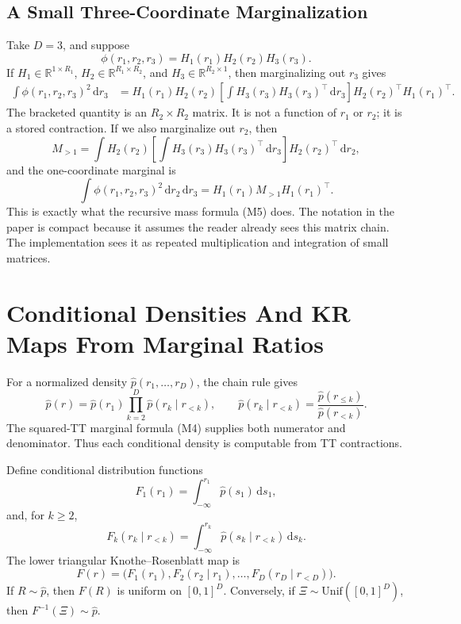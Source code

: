 \documentclass[11pt]{article}
\newcommand{\R}{\mathbb R}
\newcommand{\dd}{\,\mathrm d}
\begin{document}
\subsection{A Small Three-Coordinate Marginalization}

Take \(D=3\), and suppose
\[
    \phi(r_1,r_2,r_3)=H_1(r_1)H_2(r_2)H_3(r_3).
\]
If \(H_1\in\R^{1\times R_1}\),
\(H_2\in\R^{R_1\times R_2}\), and
\(H_3\in\R^{R_2\times 1}\), then marginalizing out \(r_3\) gives
\[
\begin{aligned}
 \int \phi(r_1,r_2,r_3)^2\dd r_3
 &=
 H_1(r_1)H_2(r_2)
 \left[\int H_3(r_3)H_3(r_3)^\top\dd r_3\right]
 H_2(r_2)^\top H_1(r_1)^\top.
\end{aligned}
\tag{M7}
\]
The bracketed quantity is an \(R_2\times R_2\) matrix.  It is not a function of
\(r_1\) or \(r_2\); it is a stored contraction.  If we also marginalize out
\(r_2\), then
\[
    M_{>1}
    =
    \int
    H_2(r_2)
    \left[\int H_3(r_3)H_3(r_3)^\top\dd r_3\right]
    H_2(r_2)^\top
    \dd r_2,
    \tag{M8}
\]
and the one-coordinate marginal is
\[
    \int\phi(r_1,r_2,r_3)^2\dd r_2\dd r_3
    =
    H_1(r_1)M_{>1}H_1(r_1)^\top.
    \tag{M9}
\]
This is exactly what the recursive mass formula (M5) does.  The notation in the
paper is compact because it assumes the reader already sees this matrix chain.
The implementation sees it as repeated multiplication and integration of small
matrices.

\section{Conditional Densities And KR Maps From Marginal Ratios}

For a normalized density \(\widehat p(r_1,\ldots,r_D)\), the chain rule gives
\[
    \widehat p(r)
    =
    \widehat p(r_1)
    \prod_{k=2}^D
    \widehat p(r_k\mid r_{<k}),
    \qquad
    \widehat p(r_k\mid r_{<k})
    =
    \frac{\widehat p(r_{\le k})}{\widehat p(r_{<k})}.
    \tag{K1}
\]
The squared-TT marginal formula (M4) supplies both numerator and denominator.
Thus each conditional density is computable from TT contractions.

Define conditional distribution functions
\[
    F_1(r_1)=\int_{-\infty}^{r_1}\widehat p(s_1)\dd s_1,
    \tag{K2}
\]
and, for \(k\ge2\),
\[
    F_k(r_k\mid r_{<k})
    =
    \int_{-\infty}^{r_k}
    \widehat p(s_k\mid r_{<k})\dd s_k.
    \tag{K3}
\]
The lower triangular Knothe--Rosenblatt map is
\[
    F(r)
    =
    \bigl(
    F_1(r_1),
    F_2(r_2\mid r_1),
    \ldots,
    F_D(r_D\mid r_{<D})
    \bigr).
    \tag{K4}
\]
If \(R\sim\widehat p\), then \(F(R)\) is uniform on \([0,1]^D\).  Conversely, if
\(\Xi\sim \mathrm{Unif}([0,1]^D)\), then \(F^{-1}(\Xi)\sim\widehat p\).
\end{document}
